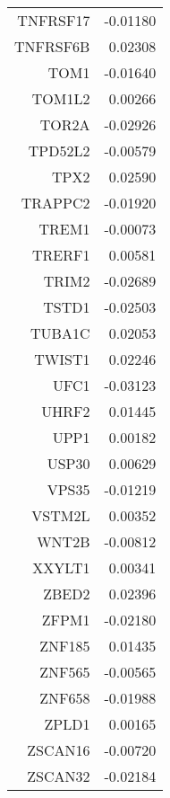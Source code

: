 \begin{longtable}{rr}
  TNFRSF17 & -0.01180 \\ 
  TNFRSF6B & 0.02308 \\ 
  TOM1 & -0.01640 \\ 
  TOM1L2 & 0.00266 \\ 
  TOR2A & -0.02926 \\ 
  TPD52L2 & -0.00579 \\ 
  TPX2 & 0.02590 \\ 
  TRAPPC2 & -0.01920 \\ 
  TREM1 & -0.00073 \\ 
  TRERF1 & 0.00581 \\ 
  TRIM2 & -0.02689 \\ 
  TSTD1 & -0.02503 \\ 
  TUBA1C & 0.02053 \\ 
  TWIST1 & 0.02246 \\ 
  UFC1 & -0.03123 \\ 
  UHRF2 & 0.01445 \\ 
  UPP1 & 0.00182 \\ 
  USP30 & 0.00629 \\ 
  VPS35 & -0.01219 \\ 
  VSTM2L & 0.00352 \\ 
  WNT2B & -0.00812 \\ 
  XXYLT1 & 0.00341 \\ 
  ZBED2 & 0.02396 \\ 
  ZFPM1 & -0.02180 \\ 
  ZNF185 & 0.01435 \\ 
  ZNF565 & -0.00565 \\ 
  ZNF658 & -0.01988 \\ 
  ZPLD1 & 0.00165 \\ 
  ZSCAN16 & -0.00720 \\ 
  ZSCAN32 & -0.02184 \\ 
   \hline
\hline
\end{longtable}
